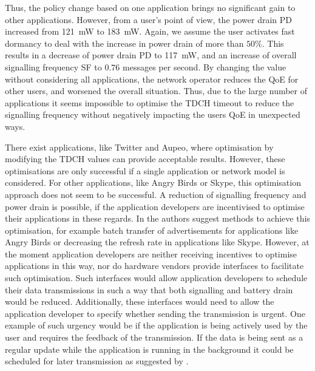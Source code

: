 Thus, the policy change based on one application brings no significant gain to other applications.
However, from a user's point of view, the power drain \gls{PD} increased from \SI{121}{\milli\watt} to \SI{183}{\milli\watt}.
Again, we assume the user activates fast dormancy to deal with the increase in power drain of more than $50\%$.
This results in a decrease of power drain \gls{PD} to \SI{117}{\milli\watt}, and an increase of overall signalling frequency \gls{SF} to \(0.76\) messages per second.
By changing the value without considering all applications, the network operator reduces the \gls{QoE} for other users, and worsened the overall situation.
Thus, due to the large number of applications it seems impossible to optimise the \gls{TDCH} timeout to reduce the signalling frequency without negatively impacting the users \gls{QoE} in unexpected ways.

There exist applications, like Twitter and Aupeo, where optimisation by modifying the \gls{TDCH} values can provide acceptable results.
However, these optimisations are only successful if a single application or network model is considered.
For other applications, like Angry Birds or Skype, this optimisation approach does not seem to be successful.
A reduction of signalling frequency and power drain is possible, if the application developers are incentivised to optimise their applications in these regards.
In \cite{Qian2011a} the authors suggest methods to achieve this optimisation, for example batch transfer of advertisements for applications like Angry Birds or decreasing the refresh rate in applications like Skype.
However, at the moment application developers are neither receiving incentives to optimise applications in this way, nor do hardware vendors provide interfaces to facilitate such optimisation.
Such interfaces would allow application developers to schedule their data transmissions in such a way that both signalling and battery drain would be reduced.
Additionally, these interfaces would need to allow the application developer to specify whether sending the transmission is urgent.
One example of such urgency would be if the application is being actively used by the user and requires the feedback of the transmission.
If the data is being sent as a regular update while the application is running in the background it could be scheduled for later transmission as suggested by \cite{Calder2010, Vergara2012}.

